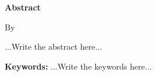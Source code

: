 {
    \centering
    \textbf{Abstract}

    \vspace{3\baselineskip}
    \textbf{\LatinThesisTitle}

    \vspace{2\baselineskip}
    By \\
    \textbf{\LatinStudentName}
    \par
}

\vspace{\baselineskip}
...Write the abstract here...

\textbf{Keywords:} ...Write the keywords here...
